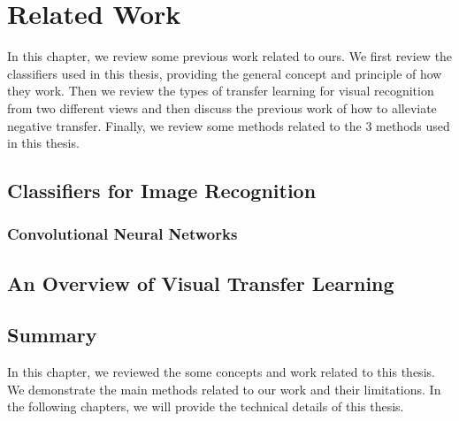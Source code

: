 \chapter{Related Work}\label{sec:works}
In this chapter, we review some previous work related to ours. We first review the classifiers used in this thesis, providing the general concept and principle of how they work. Then we review the types of transfer learning for visual recognition from two different views and then discuss the previous work of how to alleviate negative transfer. Finally, we review some methods related to the 3 methods used in this thesis.
\section{Classifiers for Image Recognition}\label{sec:relat:linear}

\subsection{Convolutional Neural Networks}

\section{An Overview of Visual Transfer Learning}

\section{Summary}
In this chapter, we reviewed the some concepts and work related to this thesis. We demonstrate the main methods related to our work and their limitations. In the following chapters, we will provide the technical details of this thesis. 